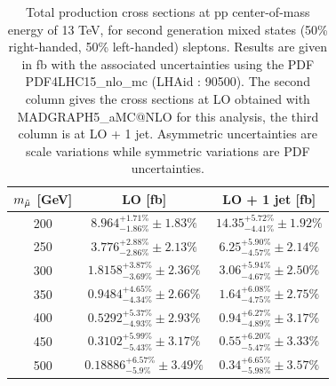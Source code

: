 \documentclass{cernatlasnote}
\begin{document}
\begin{table}
    \centering
    \begin{tabular}{ | c | c | c |}
        \hline
        \rowcolor{lightgray} 
         $m_{\Tilde{\mu}}$ [GeV] &  LO [fb] & LO + 1 jet [fb]\\
         \hline
         200  & $8.964^{+1.71\%}_{-1.86\%} \pm 1.83\%$ & $14.35^{+5.72\%}_{-4.41\%} \pm 1.92\%$ \\
         \hline
         250   & $3.776^{+2.88\%}_{-2.86\%} \pm 2.13\%$ &  $6.25^{+5.90\%}_{-4.57\%} \pm 2.14\%$\\
         \hline
         300  & $1.8158^{+3.87\%}_{-3.69\%} \pm 2.36\%$ &  $3.06^{+5.94\%}_{-4.67\%} \pm 2.50\%$\\
         \hline
         350 &  $0.9484^{+4.65\%}_{-4.34\%} \pm 2.66\%$ &  $1.64^{+6.08\%}_{-4.75\%} \pm 2.75\%$\\
         \hline
         400  & $0.5292^{+5.37\%}_{-4.93\%} \pm 2.93\%$ & $0.94^{+6.27\%}_{-4.89\%} \pm 3.17\%$\\
         \hline
         450  & $0.3102^{+5.99\%}_{-5.43\%} \pm 3.17\%$ & $0.55^{+6.20\%}_{-5.47\%} \pm 3.33\%$\\
         \hline
         500  & $0.18886^{+6.57\%}_{-5.9\%} \pm 3.49\%$ & $0.34^{+6.65\%}_{-5.98\%} \pm 3.57\%$\\
         \hline
    \end{tabular}
    \caption{Total production cross sections at pp center-of-mass energy of 13 TeV, for second generation mixed states (50\% right-handed, 50\% left-handed) sleptons. Results are given in fb with the associated uncertainties using the PDF PDF4LHC15\_nlo\_mc (LHAid : 90500). The second column gives the cross sections at LO obtained with MADGRAPH5\_aMC@NLO for this analysis, the third column is at LO + 1 jet. Asymmetric uncertainties are scale variations while symmetric variations are PDF uncertainties.} 
    \label{tab:RLLRXS}
\end{table}
\end{document}

